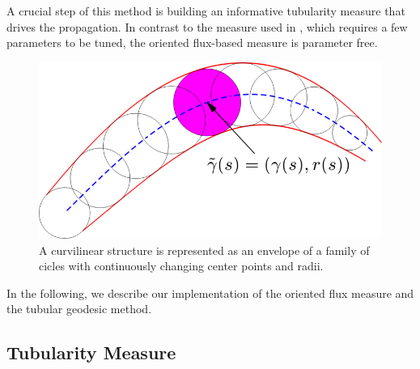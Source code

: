 \documentclass{InsightArticle}
\begin{document}
A crucial step of this method is building an informative tubularity measure that drives the propagation. In contrast to the measure used in \cite{Li07}, which requires a few parameters to be tuned, the oriented flux-based measure is parameter free.
\begin{figure}[!h]
\begin{center}		
\includegraphics[width=0.5\linewidth]{SynthVessels}
\end{center}
\caption{A curvilinear structure is represented as an envelope of a family of cicles with continuously changing center points and radii.}
\label{fig:nDVesselAs}
\end{figure}

In the following, we describe our implementation of the oriented flux measure and the tubular geodesic method.

\subsection{Tubularity Measure}
\end{document}
